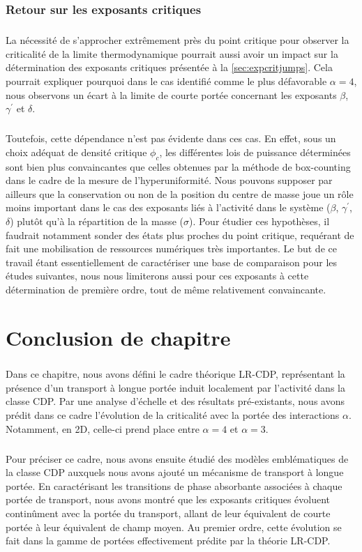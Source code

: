 \subsubsection{Retour sur les exposants critiques}

\subparagraph{}La nécessité de s'approcher extrêmement près du point critique pour observer la criticalité de la limite thermodynamique pourrait aussi avoir un impact sur la détermination des exposants critiques présentée à la \autoref{sec:expcritjumps}. Cela pourrait expliquer pourquoi dans le cas identifié comme le plus défavorable $\alpha=4$, nous observons un écart à la limite de courte portée concernant les exposants $\beta$, $\gamma^\prime$ et $\delta$.

\subparagraph{}Toutefois, cette dépendance n'est pas évidente dans ces cas. En effet, sous un choix adéquat de densité critique $\phi_c$, les différentes lois de puissance déterminées sont bien plus convaincantes que celles obtenues par la méthode de box-counting dans le cadre de la mesure de l'hyperuniformité. Nous pouvons supposer par ailleurs que la conservation ou non de la position du centre de masse joue un rôle moins important dans le cas des exposants liés à l'activité dans le système ($\beta$, $\gamma^\prime$, $\delta$) plutôt qu'à la répartition de la masse ($\sigma$). Pour étudier ces hypothèses, il faudrait notamment sonder des états plus proches du point critique, requérant de fait une mobilisation de ressources numériques très importantes. Le but de ce travail étant essentiellement de caractériser une base de comparaison pour les études suivantes, nous nous limiterons aussi pour ces exposants à cette détermination de première ordre, tout de même relativement convaincante.

\section{Conclusion de chapitre}

\subparagraph{}Dans ce chapitre, nous avons défini le cadre théorique LR-CDP, représentant la présence d'un transport à longue portée induit localement par l'activité dans la classe CDP. Par une analyse d'échelle et des résultats pré-existants, nous avons prédit dans ce cadre l'évolution de la criticalité avec la portée des interactions $\alpha$. Notamment, en 2D, celle-ci prend place entre $\alpha=4$ et $\alpha=3$.


\subparagraph{}Pour préciser ce cadre, nous avons ensuite étudié des modèles emblématiques de la classe CDP auxquels nous avons ajouté un mécanisme de transport à longue portée. En caractérisant les transitions de phase absorbante associées à chaque portée de transport, nous avons montré que les exposants critiques évoluent continûment avec la portée du transport, allant de leur équivalent de courte portée à leur équivalent de champ moyen. Au premier ordre, cette évolution se fait dans la gamme de portées effectivement prédite par la théorie LR-CDP.

